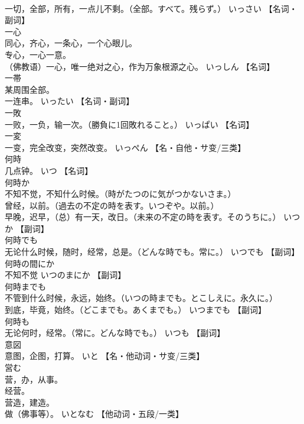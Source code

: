 \documentclass[8pt]{extreport}
\begin{document}
\begin{CJK}{UTF8}{min}
\\	一切，全部，所有，一点儿不剩。（全部。すべて。残らず。）	いっさい		【名词・副词】
\\	一心	
\\	同心，齐心，一条心，一个心眼儿。 
\\	专心，一心一意。 
\\	（佛教语）一心，唯一绝对之心，作为万象根源之心。	いっしん		【名词】
\\	一帯	
\\	某周围全部。 
\\	一连串。	いったい		【名词・副词】
\\	一敗	
\\	一败，一负，输一次。（勝負に1回敗れること。）	いっぱい		【名词】
\\	一変	
\\	一变，完全改变，突然改变。	いっぺん		【名・自他・サ变/三类】
\\	何時	
\\	几点钟。	いつ		【名词】
\\	何時か	
\\	不知不觉，不知什么时候。（時がたつのに気がつかないさま。） 
\\	曾经，以前。（過去の不定の時を表す。いつぞや。以前。） 
\\	早晚，迟早，（总）有一天，改日。（未来の不定の時を表す。そのうちに。）	いつか		【副词】
\\	何時でも	
\\	无论什么时候，随时，经常，总是。（どんな時でも。常に。）	いつでも		【副词】
\\	何時の間にか	
\\	不知不觉	いつのまにか		【副词】
\\	何時までも	
\\	不管到什么时候，永远，始终。（いつの時までも。とこしえに。永久に。） 
\\	到底，毕竟，始终。（どこまでも。あくまでも。）	いつまでも		【副词】
\\	何時も	
\\	无论何时，经常。（常に。どんな時でも。）	いつも		【副词】
\\	意図	
\\	意图，企图，打算。	いと		【名・他动词・サ变/三类】
\\	営む	
\\	营，办，从事。 
\\	经营。 
\\	营造，建造。 
\\	做（佛事等）。	いとなむ		【他动词・五段/一类】

\end{CJK}
\end{document}
